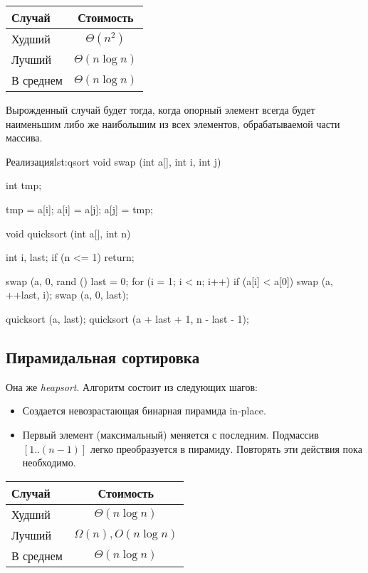 \begin{center}
  \begin{tabular}{lc}
    \toprule
    Случай & Стоимость \\
    \midrule
    Худший & $\Theta(n^2)$ \\
    Лучший & $\Theta(n \log n)$ \\
    В среднем & $\Theta(n \log n)$ \\
    \bottomrule
  \end{tabular}
\end{center}

Вырожденный случай будет тогда, когда опорный элемент всегда будет наименьшим либо же наибольшим из всех элементов, обрабатываемой части массива.

\begin{clst}{Реализация}{lst:qsort}
void swap (int a[], int i, int j) {
  int tmp;

  tmp = a[i];
  a[i] = a[j];
  a[j] = tmp;
}

void quicksort (int a[], int n) {
  int i, last;
  if (n <= 1)
    return;

  swap (a, 0, rand () %
  last = 0;
  for (i = 1; i < n; i++)
    if (a[i] < a[0])
      swap (a, ++last, i);
  swap (a, 0, last);

  quicksort (a, last);
  quicksort (a + last + 1, n - last - 1);
}
\end{clst}

\subsection{Пирамидальная сортировка}

Она же \emph{heapsort}. Алгоритм состоит из следующих шагов:
\begin{itemize}
  \item Создается невозрастающая бинарная пирамида in-place.
  \item Первый элемент (максимальный) меняется с последним. Подмассив $[1..(n - 1)]$ легко преобразуется в пирамиду. Повторять эти действия пока необходимо.
\end{itemize}

\begin{center}
  \begin{tabular}{lc}
    \toprule
    Случай & Стоимость \\
    \midrule
    Худший & $\Theta(n \log n)$ \\
    Лучший & $\Omega(n), O(n \log n)$ \\
    В среднем & $\Theta(n \log n)$ \\
    \bottomrule
  \end{tabular}
\end{center}

